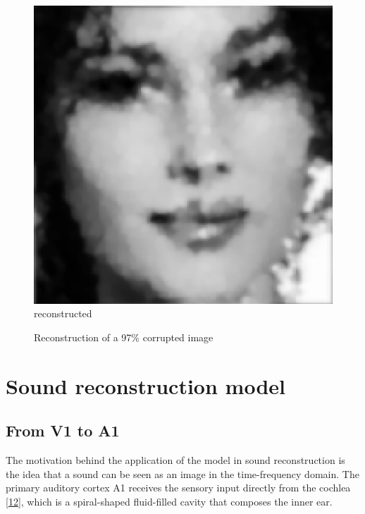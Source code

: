 \documentclass[
  american,
]{article}
\begin{document}
\begin{figure}[H]
\begin{minipage}{0.3\linewidth}
    \end{minipage}\hfill%
    \begin{minipage}{0.3\linewidth}
        \centering
        \includegraphics[width=\textwidth]{img/img_reconstructed.png}\\reconstructed
    \end{minipage}
    \caption{Reconstruction of a 97\% corrupted image}
    \label{fig:img-reconstruct}
\end{figure}

\pagebreak

\hypertarget{sound-reconstruction-model}{%
\section{Sound reconstruction model}\label{sound-reconstruction-model}}

\hypertarget{from-v1-to-a1}{%
\subsection{From V1 to A1}\label{from-v1-to-a1}}

The motivation behind the application of the model in sound reconstruction
is the idea that a sound can be seen as an image in the time-frequency domain.
The primary auditory cortex A1 receives the sensory input directly from the cochlea {[}\protect\hyperlink{ref-dallos1996}{12}{]},
which is a spiral-shaped fluid-filled cavity that composes the inner ear.
\end{document}

